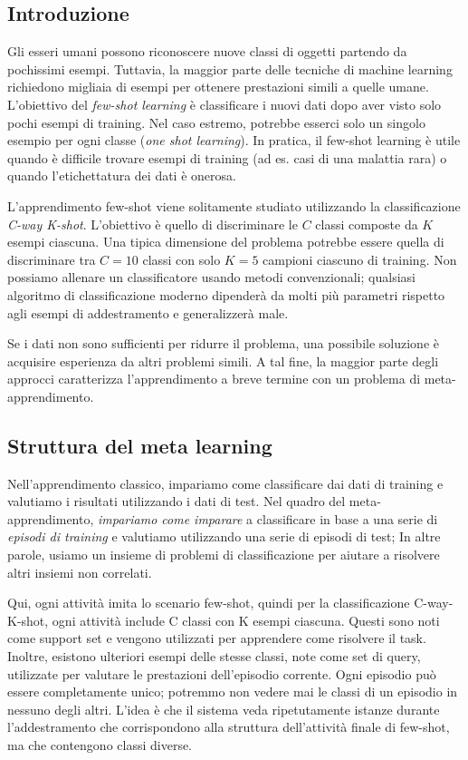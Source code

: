 \documentclass[12pt,a4paper,titlepage]{article}
\begin{document}
\subsection{Introduzione}
Gli esseri umani possono riconoscere nuove classi di oggetti partendo da pochissimi esempi. Tuttavia, la maggior parte delle tecniche di machine learning richiedono migliaia di esempi per ottenere prestazioni simili a quelle umane. L'obiettivo del \textit{few-shot learning} è classificare i nuovi dati dopo aver visto solo pochi esempi di training. Nel caso estremo, potrebbe esserci solo un singolo esempio per ogni classe (\textit{one shot learning}). In pratica, il few-shot learning è utile quando è difficile trovare esempi di training (ad es. casi di una malattia rara) o quando l'etichettatura dei dati è onerosa.

L'apprendimento few-shot viene solitamente studiato utilizzando la classificazione \emph{C-way K-shot}. L'obiettivo è quello di discriminare le $C$ classi composte da $K$ esempi ciascuna. Una tipica dimensione del problema potrebbe essere quella di discriminare tra $C=10$ classi con solo $K=5$ campioni ciascuno di training. Non possiamo allenare un classificatore usando metodi convenzionali; qualsiasi algoritmo di classificazione moderno dipenderà da molti più parametri rispetto agli esempi di addestramento e generalizzerà male.

Se i dati non sono sufficienti per ridurre il problema, una possibile soluzione è acquisire esperienza da altri problemi simili. A tal fine, la maggior parte degli approcci caratterizza l'apprendimento a breve termine con un problema di meta-apprendimento.

\subsection{Struttura del meta learning}
Nell'apprendimento classico, impariamo come classificare dai dati di training e valutiamo i risultati utilizzando i dati di test. Nel quadro del meta-apprendimento, \textit{impariamo come imparare} a classificare in base a una serie di \textit{episodi di training} e valutiamo utilizzando una serie di episodi di test; In altre parole, usiamo un insieme di problemi di classificazione per aiutare a risolvere altri insiemi non correlati.

Qui, ogni attività imita lo scenario few-shot, quindi per la classificazione C-way-K-shot, ogni attività include C classi con K esempi ciascuna. Questi sono noti come support set e vengono utilizzati per apprendere come risolvere il task. Inoltre, esistono ulteriori esempi delle stesse classi, note come set di query, utilizzate per valutare le prestazioni dell'episodio corrente. Ogni episodio può essere completamente unico; potremmo non vedere mai le classi di un episodio in nessuno degli altri. L'idea è che il sistema veda ripetutamente istanze durante l'addestramento che corrispondono alla struttura dell'attività finale di few-shot, ma che contengono classi diverse.
\end{document}
